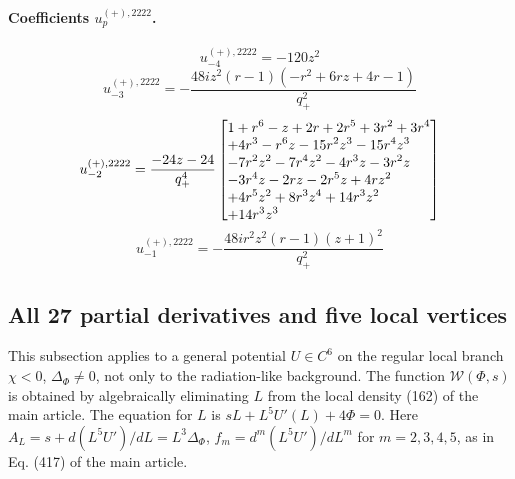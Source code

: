 \documentclass[11pt,a4paper]{article}
\begin{document}
\paragraph{Coefficients $u_p^{(+),2222}$.}
\begin{equation}
u_{-4}^{(+),2222}=- 120 z^{2}
\label{eq:cat-auxiliary-plus-2222-m4}
\end{equation}
\begin{equation}
u_{-3}^{(+),2222}=- \frac{48 i z^{2} \left(r - 1\right) \left(- r^{2} + 6 r z + 4 r - 1\right)}{q_{+}^{2}}
\label{eq:cat-auxiliary-plus-2222-m3}
\end{equation}
\begin{equation}
u_{-2}^{(+),2222}=\frac{- 24 z - 24}{q_{+}^{4}}\left[\vcenter{\hbox{\shortstack[l]{$\displaystyle 1 + r^{6} - z + 2 r + 2 r^{5} + 3 r^{2} + 3 r^{4}$\\
$\displaystyle  + 4 r^{3} - r^{6} z - 15 r^{2} z^{3} - 15 r^{4} z^{3}$\\
$\displaystyle  - 7 r^{2} z^{2} - 7 r^{4} z^{2} - 4 r^{3} z - 3 r^{2} z$\\
$\displaystyle  - 3 r^{4} z - 2 r z - 2 r^{5} z + 4 r z^{2}$\\
$\displaystyle  + 4 r^{5} z^{2} + 8 r^{3} z^{4} + 14 r^{3} z^{2}$\\
$\displaystyle  + 14 r^{3} z^{3}$}}}\right]
\label{eq:cat-auxiliary-plus-2222-m2}
\end{equation}
\begin{equation}
u_{-1}^{(+),2222}=- \frac{48 i r^{2} z^{2} \left(r - 1\right) \left(z + 1\right)^{2}}{q_{+}^{2}}
\label{eq:cat-auxiliary-plus-2222-m1}
\end{equation}

\subsection{All 27 partial derivatives and five local vertices}
\label{sec:cat-local-vertices}
This subsection applies to a general potential $ U\in C^6 $ on the regular local branch $ \chi<0 $, $ \Delta_\Phi\ne0 $, not only to the radiation-like background. The function $ \mathcal W(\Phi,s) $ is obtained by algebraically eliminating $ L $ from the local density (162) of the main article. The equation for $ L $ is $ sL+L^5U'(L)+4\Phi=0 $. Here $ A_L=s+d(L^5U')/dL=L^3\Delta_\Phi $, $ f_m=d^m(L^5U')/dL^m $ for $ m=2,3,4,5 $, as in Eq. (417) of the main article.
\end{document}
